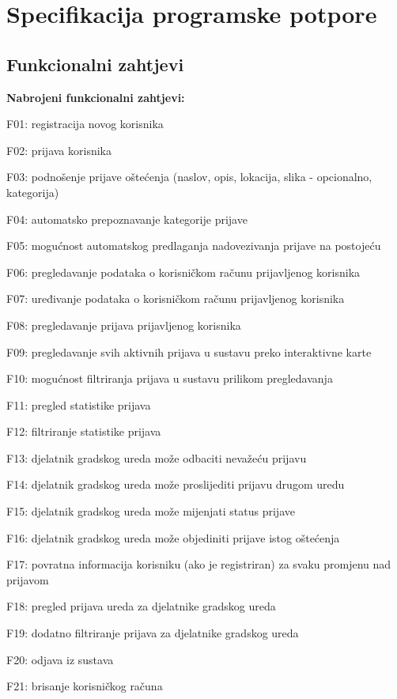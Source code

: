 \chapter{Specifikacija programske potpore}
		
	\section{Funkcionalni zahtjevi}
			
			\textbf{Nabrojeni funkcionalni zahtjevi:}
			\begin{packed_item}
				\item F01: registracija novog korisnika
				\item F02: prijava korisnika
				\item F03: podnošenje prijave oštećenja (naslov, opis, lokacija, slika - opcionalno, kategorija)
				\item F04: automatsko prepoznavanje kategorije prijave
				\item F05: mogućnost automatskog predlaganja nadovezivanja prijave na postojeću
				\item F06: pregledavanje podataka o korisničkom računu prijavljenog korisnika
				\item F07: uređivanje podataka o korisničkom računu prijavljenog korisnika
				\item F08: pregledavanje prijava prijavljenog korisnika
				\item F09: pregledavanje svih aktivnih prijava u sustavu preko interaktivne karte
				\item F10: mogućnost filtriranja prijava u sustavu prilikom pregledavanja
				\item F11: pregled statistike prijava
				\item F12: filtriranje statistike prijava
				\item F13: djelatnik gradskog ureda može odbaciti nevažeću prijavu
				\item F14: djelatnik gradskog ureda može proslijediti prijavu drugom uredu
				\item F15: djelatnik gradskog ureda može mijenjati status prijave
				\item F16: djelatnik gradskog ureda može objediniti prijave istog oštećenja
				\item F17: povratna informacija korisniku (ako je registriran) za svaku promjenu nad prijavom
				\item F18: pregled prijava ureda za djelatnike gradskog ureda
				\item F19: dodatno filtriranje prijava za djelatnike gradskog ureda
				\item F20: odjava iz sustava
				\item F21: brisanje korisničkog računa
			\end{packed_item}
			\eject
			
